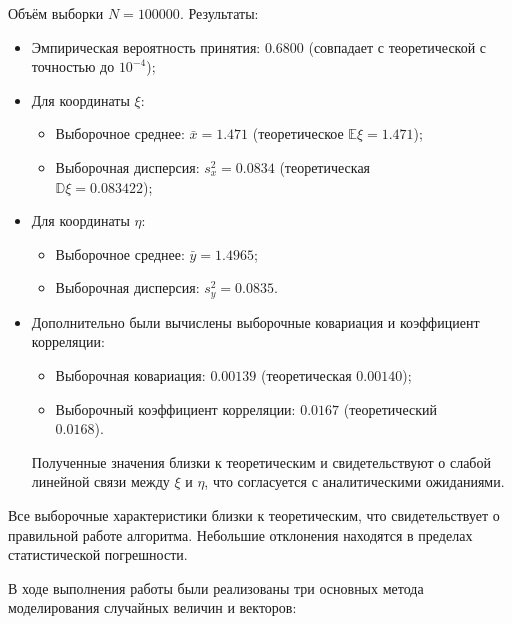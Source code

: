 \documentclass[bachelor, och, pract3]{SCWorks}
\begin{document}
Объём выборки $N=100000$. Результаты:
\begin{itemize}
    \item Эмпирическая вероятность принятия: $0.6800$ (совпадает с теоретической с точностью до $10^{-4}$);
    \item Для координаты $\xi$:
        \begin{itemize}
            \item Выборочное среднее: $\bar{x} = 1.471$ (теоретическое $\mathbb E\xi = 1.471$);
            \item Выборочная дисперсия: $s_x^2 = 0.0834$ (теоретическая \\ $\mathbb D\xi = 0.083422$);
        \end{itemize}
    \item Для координаты $\eta$:
        \begin{itemize}
            \item Выборочное среднее: $\bar{y} = 1.4965$;
            \item Выборочная дисперсия: $s_y^2 = 0.0835$.
        \end{itemize}
    \item Дополнительно были вычислены выборочные ковариация и коэффициент корреляции:
        \begin{itemize}
            \item Выборочная ковариация: $0.00139$ (теоретическая $0.00140$);
            \item Выборочный коэффициент корреляции: $0.0167$ (теоретический \\ $0.0168$).
        \end{itemize}
        Полученные значения близки к теоретическим и свидетельствуют о слабой линейной связи между $\xi$ и $\eta$, что согласуется с аналитическими ожиданиями.
\end{itemize}
Все выборочные характеристики близки к теоретическим, что свидетельствует о правильной работе алгоритма. Небольшие отклонения находятся в пределах статистической погрешности.



\conclusion

В ходе выполнения работы были реализованы три основных метода моделирования случайных величин и векторов:
\end{document}
